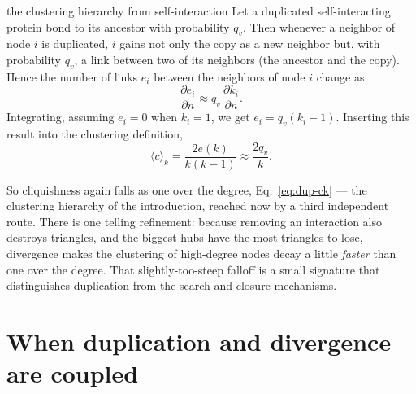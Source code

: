 \begin{calculation}{the clustering hierarchy from self-interaction}
Let a duplicated self-interacting protein bond to its ancestor with probability
$q_v$. Then whenever a neighbor of node $i$ is duplicated, $i$ gains not only the
copy as a new neighbor but, with probability $q_v$, a link between two of its
neighbors (the ancestor and the copy). Hence the number of links $e_i$ between the
neighbors of node $i$ change as
\begin{equation}
\frac{\partial e_i}{\partial n} \approx q_v\,\frac{\partial k_i}{\partial n}.
\end{equation}
Integrating, assuming $e_i=0$ when $k_i=1$, we get $e_i = q_v (k_i - 1)$.
Inserting this result into the clustering definition,
\begin{equation}
  \langle c\rangle_k = \frac{2 e(k)}{k(k-1)} \approx \frac{2 q_v}{k}.
  \label{eq:dup-ck}
\end{equation}
\end{calculation}

So cliquishness again falls as one over the degree, Eq.~\eqref{eq:dup-ck} --- the
clustering hierarchy of the introduction, reached now by a third independent
route. There is one telling refinement: because removing an interaction also
destroys triangles, and the biggest hubs have the most triangles to lose,
divergence makes the clustering of high-degree nodes decay a little \emph{faster}
than one over the degree. That slightly-too-steep falloff is a small signature
that distinguishes duplication from the search and closure mechanisms.

\section{When duplication and divergence are coupled}


